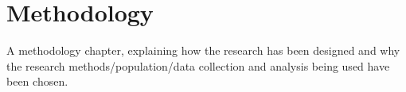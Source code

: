 \chapter{Methodology}
A methodology chapter, explaining how the research has been designed and why the research methods/population/data collection and analysis being used have been chosen.